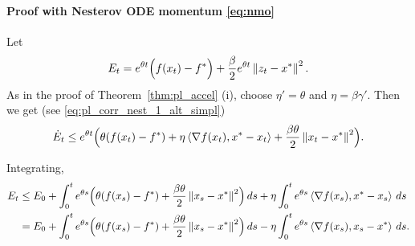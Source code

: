 \documentclass{article}
\newcommand{\bpar}[1]{\left(#1\right)}
\newcommand{\norm}[1]{\left\lVert#1\right\rVert}
\newcommand{\dotprod}[1]{\left< #1\right>}
\theoremstyle{plain}
\theoremstyle{definition}
\theoremstyle{remark}
\begin{document}







\paragraph{Proof with Nesterov ODE momentum \eqref{eq:nmo}}

Let
\[
E_t = e^{\theta t}\Bigl(f(x_t)-f^\ast\Bigr)+\frac{\beta}{2}e^{\theta t}\norm{z_t-x^\ast}^2.
\]
As in the proof of Theorem~\ref{thm:pl_accel} (i), choose $\eta'=\theta$ and $\eta=\beta\gamma'$.
Then we get (see \eqref{eq:pl_corr_nest_1_alt_simpl})
\begin{equation}\label{eq:pl_corr_avg_nest_1_corr}
 \dot{E}_t \le e^{\theta t}\Bigl(
 \theta(f(x_t)-f^\ast)
 +\eta\dotprod{\nabla f(x_t), x^\ast - x_t}
 +\frac{\beta\theta}{2}\norm{x_t-x^\ast}^2
 \Bigr).
\end{equation}

Integrating,
\begin{align}
E_t
&\le E_0 + \int_0^t e^{\theta s}\Bigl(
 \theta(f(x_s)-f^\ast)
 +\frac{\beta\theta}{2}\norm{x_s-x^\ast}^2
 \Bigr)\,ds
 + \eta\int_0^t e^{\theta s}\dotprod{\nabla f(x_s),x^\ast-x_s}\,ds \nonumber\\
&= E_0 + \int_0^t e^{\theta s}\Bigl(
 \theta(f(x_s)-f^\ast)
 +\frac{\beta\theta}{2}\norm{x_s-x^\ast}^2
 \Bigr)\,ds
 - \eta\int_0^t e^{\theta s}\dotprod{\nabla f(x_s),x_s-x^\ast}\,ds.\label{eq:pl_corr_avg_nest_2_corr}
\end{align}
\end{document}
